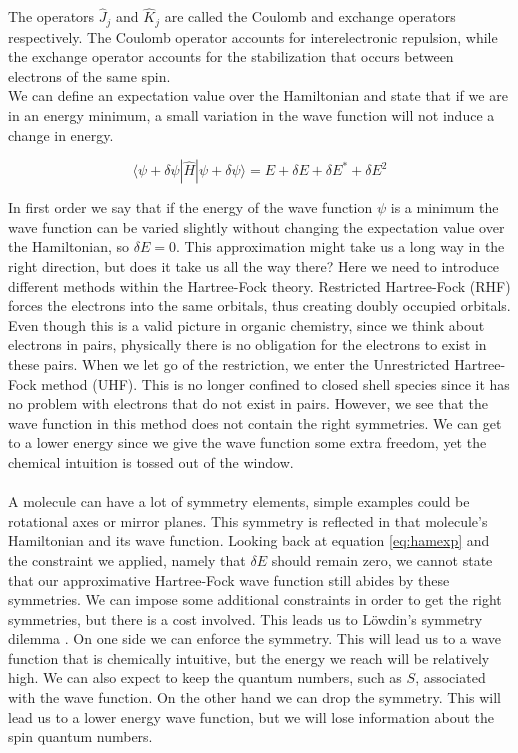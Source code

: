 The operators $\hat{J}_j$ and $\hat{K}_j$ are called the Coulomb and exchange operators respectively. The Coulomb operator accounts for interelectronic repulsion, while the exchange
operator accounts for the stabilization that occurs between electrons of the same spin. \\

We can define an expectation value over the Hamiltonian and state that if we are in an energy minimum, a small variation in the wave function will not induce a change
in energy.

\begin{equation}\label{eq:hamexp}
  \langle\psi + \delta\psi|\hat{H}|\psi + \delta\psi \rangle = E + \delta E + \delta E^* + \delta E^2
\end{equation}

In first order we say that if the energy of the wave function $\psi$ is a minimum the wave function can be varied slightly without changing the expectation value over the
Hamiltonian, so $\delta E = 0$.
This approximation might take us a long way in the right direction, but does it take us all the way there? Here we need to introduce different methods within the
Hartree-Fock theory. Restricted Hartree-Fock (RHF) forces the electrons into the same orbitals, thus creating doubly occupied orbitals. Even though this is a valid picture
in organic chemistry, since we think about electrons in pairs, physically there is no obligation for the electrons to exist in these pairs.
When we let go of the restriction, we enter the Unrestricted Hartree-Fock method (UHF). This  is no longer confined to closed shell species since it has no problem with
electrons that do not exist in pairs. However, we see that the wave function in this method does not contain the right symmetries. We can get to a lower energy since we give
the wave function some extra freedom, yet the chemical intuition is tossed out of the window.
\paragraph*{}
A molecule can have a lot of symmetry elements, simple examples could be rotational axes or mirror planes. This symmetry is reflected in that molecule's Hamiltonian and its wave
function.
Looking back at equation \eqref{eq:hamexp} and
the constraint we applied, namely that $\delta E$ should remain zero, we cannot state that our approximative Hartree-Fock wave function still abides by these symmetries.
We can impose some additional constraints in order to get the right symmetries, but there is a cost involved. This leads us to Löwdin's symmetry dilemma  \cite{Lowdin1963}.
On one side we can enforce the symmetry. This will lead us to a wave function that is chemically intuitive, but the energy we reach will be relatively high. We can also expect to
keep the quantum numbers, such as $S$, associated with the wave function. On the other hand we can drop the symmetry. This will lead us to a lower energy wave function, but we will
lose information about the spin quantum numbers.

